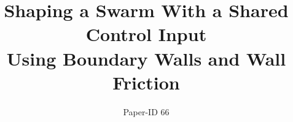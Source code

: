 \documentclass[conference]{IEEEtran}
\begin{document}
\title{Shaping a Swarm With a Shared Control Input\\ Using Boundary Walls and Wall Friction}

\author{Paper-ID 66}





% 


\maketitle
\end{document}

